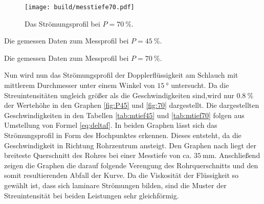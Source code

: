 \begin{figure}
 \centering
 \caption{Das Strömungsprofil bei $P = \SI{70}{\percent}$.}
 \texttt{[image: build/messtiefe70.pdf]}
 \label{fig:P70}
\end{figure}

\begin{table}
 \centering
 \caption{Die gemessen Daten zum Messprofil bei $P = \SI{45}{\percent}$.}
 
 \label{tab:mtief45}
\end{table}

\begin{table}
 \centering
 \caption{Die gemessen Daten zum Messprofil bei $P = \SI{70}{\percent}$.}
 
 \label{tab:mtief70}
\end{table}

Nun wird nun das Strömungsprofil der Dopplerflüssigkeit am Schlauch mit mittlerem
Durchmesser unter einem Winkel von $\SI{15}{\degree}$ untersucht. Da die Streuintensitäten ungleich größer als die Geschwindigkeiten
sind,wird nur $\SI{0.8}{\percent}$ der Wertehöhe in den Graphen \ref{fig:P45} und \ref{fig:70} dargestellt. Die
dargestellten Geschwindigkeiten in den Tabellen \ref{tab:mtief45} und \ref{tab:mtief70} folgen aus Umstellung von Formel \ref{eq:deltaf}.
 In beiden Graphen lässt sich das Strömungsprofil in Form des Hochpunktes erkennen. Dieses
 entsteht, da die Geschwindigkeit in Richtung Rohrzentrum ansteigt. Den Graphen nach liegt
 der breiteste Querschnitt des Rohres bei einer Messtiefe von ca. $\SI{35}{\milli\meter}$.
 Anschließend zeigen die Graphen die darauf folgende Verengung des Rohrquerschnitts
 und den somit resultierenden Abfall der Kurve. Da die Viskosität der Flüssigkeit so
 gewählt ist, dass sich laminare Strömungen bilden, sind die Muster der Streuintensität
 bei beiden Leistungen sehr gleichförmig.
